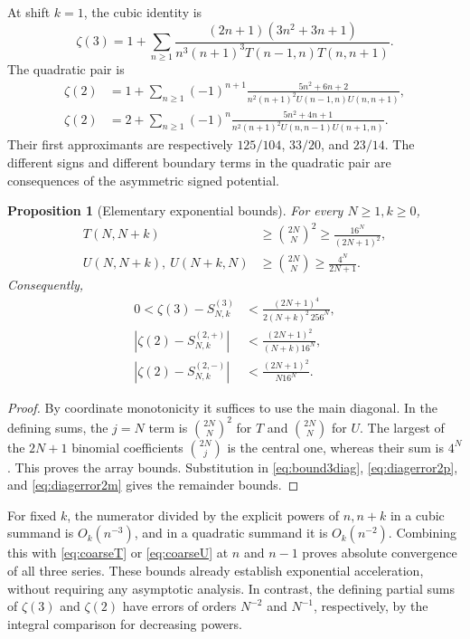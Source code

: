 \documentclass[11pt]{article}
\numberwithin{equation}{section}
\newtheorem{proposition}[theorem]{Proposition}
\theoremstyle{definition}
\theoremstyle{remark}
\newcommand{\Sthree}[2]{S^{(3)}_{#1,#2}}
\newcommand{\Stwop}[2]{S^{(2,+)}_{#1,#2}}
\newcommand{\Stwom}[2]{S^{(2,-)}_{#1,#2}}
\begin{document}
At shift $k=1$, the cubic identity is
\[
 \zeta(3)=1+\sum_{n\geq1}
 \frac{(2n+1)(3n^2+3n+1)}
 {n^3(n+1)^3T(n-1,n)T(n,n+1)}.
\]
The quadratic pair is
\begin{align*}
 \zeta(2)&=1+\sum_{n\geq1}(-1)^{n+1}
 \frac{5n^2+6n+2}{n^2(n+1)^2U(n-1,n)U(n,n+1)},\\
 \zeta(2)&=2+\sum_{n\geq1}(-1)^n
 \frac{5n^2+4n+1}{n^2(n+1)^2U(n,n-1)U(n+1,n)}.
\end{align*}
Their first approximants are respectively $125/104$, $33/20$, and $23/14$.
The different signs and different boundary terms in the quadratic pair
are consequences of the asymmetric signed potential.

\begin{proposition}[Elementary exponential bounds]\label{prop:coarse}
For every $N\geq1,k\geq0$,
\begin{align}
 T(N,N+k)&\geq\binom{2N}N^2\geq\frac{16^N}{(2N+1)^2},\label{eq:coarseT}\\
 U(N,N+k),\ U(N+k,N)&\geq\binom{2N}N\geq\frac{4^N}{2N+1}.\label{eq:coarseU}
\end{align}
Consequently,
\begin{align}
0<\zeta(3)-\Sthree{N}{k}
 &<\frac{(2N+1)^4}{2(N+k)^2\,256^N},\label{eq:coarseerrT}\\
|\zeta(2)-\Stwop{N}{k}|&<\frac{(2N+1)^2}{(N+k)16^N},\label{eq:coarseerrUp}\\
|\zeta(2)-\Stwom{N}{k}|&<\frac{(2N+1)^2}{N16^N}.\label{eq:coarseerrUm}
\end{align}
\end{proposition}
\begin{proof}
By coordinate monotonicity it suffices to use the main diagonal.
In the defining sums, the $j=N$ term is $\binom{2N}N^2$ for $T$ and
$\binom{2N}N$ for $U$. The largest of the $2N+1$ binomial coefficients
$\binom{2N}j$ is the central one, whereas their sum is $4^N$.
This proves the array bounds. Substitution in
\eqref{eq:bound3diag}, \eqref{eq:diagerror2p}, and
\eqref{eq:diagerror2m} gives the remainder bounds.
\end{proof}

For fixed $k$, the numerator divided by the explicit powers of $n,n+k$
in a cubic summand is $O_k(n^{-3})$, and in a quadratic summand it is
$O_k(n^{-2})$. Combining this with \eqref{eq:coarseT} or
\eqref{eq:coarseU} at $n$ and $n-1$ proves absolute convergence of all
three series. These bounds already establish exponential acceleration,
without requiring any asymptotic analysis. In contrast, the defining
partial sums of $\zeta(3)$ and $\zeta(2)$ have errors of orders $N^{-2}$
and $N^{-1}$, respectively, by the integral comparison for decreasing
powers.
\end{document}
